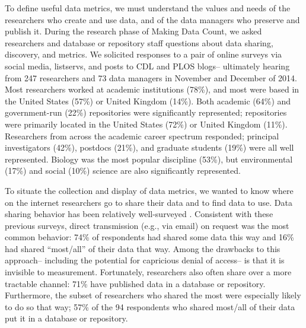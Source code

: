\documentclass[english]{article}
\begin{document}

To define useful data metrics, we must understand the values and needs of the researchers who create and use data, and of the data managers who preserve and publish it.
During the research phase of Making Data Count, we asked researchers and database or repository staff questions about data sharing, discovery, and metrics.
We solicited responses to a pair of online surveys via social media, listservs, and posts to CDL and PLOS blogs-- ultimately hearing from 247 researchers and 73 data managers in November and December of 2014.
Most researchers worked at academic institutions (78\%), and most were based in the United States (57\%) or United Kingdom (14\%).
Both academic (64\%) and government-run (22\%) repositories were significantly represented; repositories were primarily located in the United States (72\%) or United Kingdom (11\%).
Researchers from across the academic career spectrum responded; principal investigators (42\%), postdocs (21\%), and graduate students (19\%) were all well represented. 
Biology was the most popular discipline (53\%), but environmental (17\%) and social (10\%) science are also significantly represented. 



To situate the collection and display of data metrics, we wanted to know where on the internet researchers go to share their data and to find data to use. 
Data sharing behavior has been relatively well-surveyed \cite{tenopir_data_2011, akers_disciplinary_2013, wallis_if_2013, aydinoglu_data_2014, kratz_researcher_2015}. 
Consistent with these previous surveys, direct transmission (e.g., via email) on request was the most common behavior: 74\% of respondents had shared some data this way and 16\% had shared ``most/all'' of their data that way.
Among the drawbacks to this approach-- including the potential for capricious denial of access-- is that it is invisible to measurement. 
Fortunately, researchers also often share over a more tractable channel: 71\% have published data in a database or repository.
Furthermore, the subset of researchers who shared the most were especially likely to do so that way; 57\% of the 94 respondents who shared most/all of their data put it in a database or repository.
\end{document}
